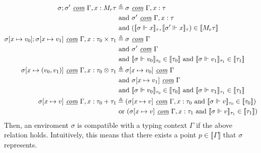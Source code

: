 \begin{definition}
\begin{equation}
\begin{normalsize}
\begin{aligned}[c]
      \sigma; \sigma' \textit{ \underline{com} } \Gamma, x: M_r \tau &\triangleq 
      \sigma \textit{ \underline{com} } \Gamma, x : \tau \\
      & \text{ and } \sigma' \textit{ \underline{com} } \Gamma, x : \tau \\
      & \text{ and } (\llbracket \sigma \Vdash x \rrbracket_{\tau}, \llbracket
      \sigma' \Vdash x \rrbracket_{\tau}) \in \llbracket M_r \tau \rrbracket \\
      \sigma[x \mapsto v_0];\sigma[x \mapsto v_1] \textit{ \underline{com} }
      \Gamma, x : \tau_0 \times \tau_1 &\triangleq 
      \sigma \textit{ \underline{com} } \Gamma \\ 
      & \text{ and } \sigma' \textit{ \underline{com} } \Gamma \\
      & \text{ and } \llbracket \sigma \Vdash v_0 \rrbracket_{\tau_0} \in
          \llbracket \tau_0 \rrbracket
        \text{ and } \llbracket \sigma \Vdash v_1 \rrbracket_{\tau_1} \in
          \llbracket \tau_1 \rrbracket \\
      \sigma[x \mapsto (v_0, v_1)] \textit{ \underline{com} } \Gamma, x : \tau_0
      \otimes \tau_1 &\triangleq
      \sigma[x \mapsto v_0] \textit{ \underline{com} } \Gamma \\
      & \text{ and } \sigma[x \mapsto v_1] \textit{ \underline{com} } \Gamma \\
      & \text{ and } \llbracket \sigma \Vdash v_0 \rrbracket_{\tau_0} \in
          \llbracket \tau_0 \rrbracket
        \text{ and } \llbracket \sigma \Vdash v_1 \rrbracket_{\tau_1} \in
          \llbracket \tau_1 \rrbracket \\
      \sigma[x \mapsto v] \textit{ \underline{com} } \Gamma, x : \tau_0 + \tau_1
      &\triangleq
      (\sigma[x \mapsto v] \textit{ \underline{com} } \Gamma, x : \tau_0 
        \text{ and } \llbracket \sigma \Vdash v \rrbracket_{\tau_0} \in
          \llbracket \tau_0 \rrbracket) \\
      & \text{ or } (\sigma[x \mapsto v] \textit{ \underline{com} } \Gamma, x :
      \tau_1 
        \text{ and } \llbracket \sigma \Vdash v \rrbracket_{\tau_1} \in
          \llbracket \tau_1 \rrbracket) \\
    \end{aligned}
    \end{normalsize}
  \end{equation}
  Then, an enviroment $\sigma$ is compatible with a typing context $\Gamma$ if
  the above relation holds. Intuitively, this means that there exists a point $p
  \in \llbracket \Gamma \rrbracket$ that $\sigma$ represents.
\end{definition}


